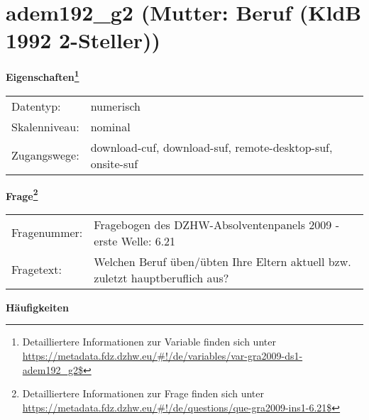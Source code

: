 
    \setcounter{footnote}{0}

    \vspace*{-1.8cm}
	\section{adem192\_g2 (Mutter: Beruf (KldB 1992 2-Steller))}
	\label{section:adem192_g2}



    \vspace*{0.5cm}
    \noindent\textbf{Eigenschaften\footnote{Detailliertere Informationen zur Variable finden sich unter
		\url{https://metadata.fdz.dzhw.eu/\#!/de/variables/var-gra2009-ds1-adem192_g2$}}}\\
	\begin{tabularx}{\hsize}{@{}lX}
	Datentyp: & numerisch \\
	Skalenniveau: & nominal \\
	Zugangswege: &
	  download-cuf, 
	  download-suf, 
	  remote-desktop-suf, 
	  onsite-suf
 \\
    \end{tabularx}



				\vspace*{0.5cm}
                \noindent\textbf{Frage\footnote{Detailliertere Informationen zur Frage finden sich unter
		              \url{https://metadata.fdz.dzhw.eu/\#!/de/questions/que-gra2009-ins1-6.21$}}}\\
				\begin{tabularx}{\hsize}{@{}lX}
					Fragenummer: &
					  Fragebogen des DZHW-Absolventenpanels 2009 - erste Welle:
					  6.21
 \\
					Fragetext: & Welchen Beruf üben/übten Ihre Eltern aktuell bzw. zuletzt hauptberuflich aus? \\
				\end{tabularx}





        		\vspace*{0.5cm}
                \noindent\textbf{Häufigkeiten}

